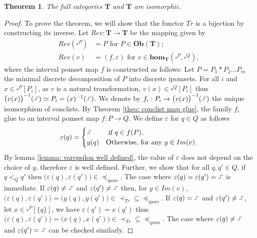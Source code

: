 \documentclass[11pt,a4paper,oldfontcommands]{memoir}
\newcommand*{\intpom}{\TrO}
\newcommand{\TrO}{\mathbf{T}}
\newcommand*\exec{%
  \raisebox{1pt}{%
    \begin{tikzpicture}[x=.8ex,y=1ex,-]
      \draw (0,0) -- (1,0) -- (1,1) -- (2,1);
    \end{tikzpicture}}}
\newtheorem{theorem}[definition]{Theorem}
\begin{document}
  \begin{theorem}
      The full categories $\intpom$ and $\TrO$ are isomorphic.
  \end{theorem}
\begin{proof}
To prove the theorem, we will show that the functor $Tr$ is a bijection by constructing its inverse.
Let $Rev: \TrO \rightarrow \intpom$ be the mapping given by 
     \begin{align*}
Rev(\square^P)& =P \text{ for } P \in \mathbf{Ob}(\TrO);  \\
Rev(v)&=(f,\varepsilon) \text{ for } v \in \mathbf{hom}_{\TrO}(\square^P,\square^Q),   
\end{align*}   
where the interval pomset map $f$ is constructed as follows: Let $P= P_1*P_2 \dots P_m$ the minimal discrete decomposition of $P$ into discrete ipomsets. For all $i$ and $x\in \square^P[P_i]$, as $v$ is a natural transformation, $v(x) \in \square^Q[P_i]$ thus $\bigl(v(x)\bigl)^{-1}(\exec) \simeq P_i = (x)^{-1}(\exec)$. We denote by \linebreak $f_i: P_i \to \bigl(v(x)\bigl)^{-1}(\exec)$ the unique isomorphism of conclists. By Theorem \ref{theo: conclist map glue}, the family $f_i$ glue to an interval pomset map $f: P \to Q$. We define $\varepsilon$ for $q \in Q$ as follows
    $$\varepsilon(q)= \begin{cases} \exec &   \text { if } q\in f(P), \\ y(q) & \text {Otherwise, for any } y \in Im(v). \end{cases}
$$
By lemma \ref{lemma: varepsilon well defined}, the value of $\varepsilon$ does not depend on the choice of $y$, therefore $\varepsilon$ is well defined. Further, we show that for all $q,q'\in Q$, if $q<_Q q'$ then $\bigl( \varepsilon(q),\varepsilon(q')\bigl) \in {\preceq_{ipom}}$. The case where $\varepsilon(q)=\varepsilon(q')= \exec$ is immediate. If $\varepsilon(q)\neq \exec$ and $\varepsilon(q') \neq \exec$ then, for $y \in Im(v)$, $\bigl( \varepsilon(q),\varepsilon(q')\bigl)= \bigl( y(q),y(q')\bigl) \in {\prec_{Tr}} \subseteq {\preceq_{ipom}}$. If $\varepsilon(q)=\exec$ and $\varepsilon(q') \neq \exec$, let $x \in \square^P[\{ q\}]$, we have $\varepsilon(q')=x(q')$ thus $\bigl(\varepsilon(q),\varepsilon(q')\bigl)=\bigl(x(q),x(q')\bigl) \in {\prec_{Tr}} \subseteq {\preceq_{ipom}}$. The case where $\varepsilon(q) \neq \exec$ and $\varepsilon(q') = \exec$ can be checked similarly.


\end{proof}
\end{document}
